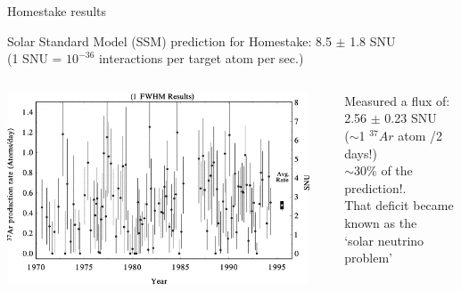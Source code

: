\begin{frame}[t]{Homestake results}

\begin{center}
Solar Standard Model (SSM) prediction for Homestake:  {\color{blue}8.5 $\pm$ 1.8 SNU}\\
(1 SNU = $10^{-36}$ interactions per target atom per sec.)\\
\end{center}
\vspace{0.4cm}
\begin{columns}
  \begin{column}{0.67\textwidth}
     \includegraphics[width=0.95\textwidth]{./images/3nu/solar/homestake_results.png}\\
  \end{column}
  \begin{column}{0.33\textwidth}
   \begin{center}
      Measured a flux of:\\ {\color{red}2.56 $\pm$ 0.23 SNU}\\
      {\small ($\sim$1 $^{37}Ar$ atom /2 days!)}\\
      \vspace{0.4cm}
      {\color{red}$\sim$30\%} of the prediction!.\\
      \vspace{0.4cm}
      That deficit became known as the\\ {\color{red} `solar neutrino problem'}
   \end{center}
  \end{column}
\end{columns}
\end{frame}


